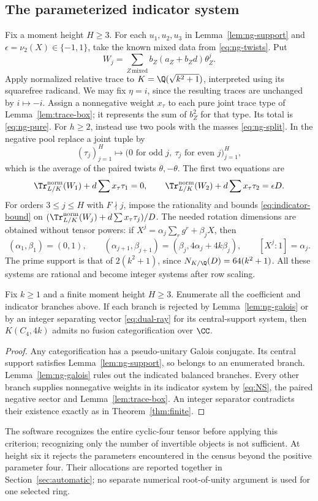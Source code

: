 \subsection{The parameterized indicator system}
Fix a moment height $H\ge3$. For each $u_1,u_2,u_3$ in Lemma~\ref{lem:ng-support} and
$\epsilon=\nu_2(X)\in\{-1,1\}$, take the known mixed data from
\eqref{eq:ng-twists}. Put
\[
 W_j=\sum_{Z\,\mathrm{mixed}} b_Z(a_Z+b_Zd)\theta_Z^j.
\]
Apply normalized relative trace to $K=\Q(\sqrt{k^2+1})$, interpreted
using its squarefree radicand. We may fix $\eta=i$, since the resulting
traces are unchanged by $i\mapsto-i$. Assign a nonnegative weight
$x_\tau$ to each pure joint trace type of Lemma~\ref{lem:trace-box}; it
represents the sum of $b_Z^2$ for that type. Its total is
\eqref{eq:ng-pure}. For $h\ge2$, instead use two pools with the masses
\eqref{eq:ng-split}. In the negative pool replace a joint tuple by
\[
 (\tau_j)_{j=1}^H\longmapsto
 \bigl(0\text{ for odd }j,\ \tau_j\text{ for even }j\bigr)_{j=1}^H,
\]
which is the average of the paired twists $\theta,-\theta$.
The first two equations are
\[
 \Tr^{\mathrm{norm}}_{L/K}(W_1)+d\sum x_\tau\tau_1=0,\qquad
 \Tr^{\mathrm{norm}}_{L/K}(W_2)+d\sum x_\tau\tau_2=\epsilon D.
\]
For orders $3\le j\le H$ with $F\nmid j$, impose the rationality and
bounds \eqref{eq:indicator-bound} on
$(\Tr^{\mathrm{norm}}_{L/K}(W_j)+d\sum x_\tau\tau_j)/D$.
The needed rotation dimensions are obtained without tensor powers:
if $X^j=\alpha_j\sum_rg^r+\beta_jX$, then
\[
 (\alpha_1,\beta_1)=(0,1),\qquad
 (\alpha_{j+1},\beta_{j+1})=(\beta_j,4\alpha_j+4k\beta_j),\qquad
 [X^j:1]=\alpha_j.
\]
The prime support is that of $2(k^2+1)$, since
$N_{K/\Q}(D)=64(k^2+1)$. All these systems are rational and become
integer systems after row scaling.

\begin{theorem}\label{thm:cyclic}
Fix $k\ge1$ and a finite moment height $H\ge3$. Enumerate all the
coefficient and indicator branches above. If each branch is rejected by
Lemma~\ref{lem:ng-galois} or by an integer separating vector
\eqref{eq:dual-ray} for its central-support system, then $K(C_4,4k)$
admits no fusion categorification over $\CC$.
\end{theorem}
\begin{proof}
Any categorification has a pseudo-unitary Galois conjugate. Its central
support satisfies Lemma~\ref{lem:ng-support}, so belongs to an enumerated
branch. Lemma~\ref{lem:ng-galois} rules out the indicated balanced
branches. Every other branch supplies nonnegative weights in its
indicator system by \eqref{eq:NS}, the paired negative sector and
Lemma~\ref{lem:trace-box}. An integer separator contradicts their
existence exactly as in Theorem~\ref{thm:finite}.
\end{proof}

The software recognizes the entire cyclic-four tensor before applying
this criterion; recognizing only the number of invertible objects is
not sufficient. At height six it rejects the parameters encountered in
the census beyond the positive parameter four. Their allocations are
reported together in Section~\ref{sec:automatic}; no separate numerical
root-of-unity argument is used for one selected ring.
